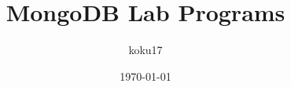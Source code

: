 \documentclass{article}
\title{MongoDB Lab Programs}
\author{koku17}
\date{\today}
\begin{document}
	\inputminted{js}{out/final_print.out}
\end{document}
